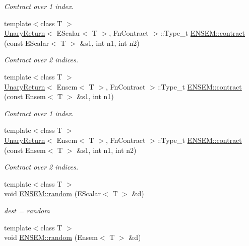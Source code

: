 \begin{DoxyCompactItemize}
\begin{DoxyCompactList}\small\item\em Contract over 1 index. \end{DoxyCompactList}\item 
{\footnotesize template$<$class T $>$ }\\\mbox{\hyperlink{structUnaryReturn}{Unary\+Return}}$<$ E\+Scalar$<$ T $>$, Fn\+Contract $>$\+::Type\+\_\+t \mbox{\hyperlink{namespaceENSEM_a370746f882b263d5a3925d4fae5c899b}{E\+N\+S\+E\+M\+::contract}} (const E\+Scalar$<$ T $>$ \&s1, int n1, int n2)
\begin{DoxyCompactList}\small\item\em Contract over 2 indices. \end{DoxyCompactList}\item 
{\footnotesize template$<$class T $>$ }\\\mbox{\hyperlink{structUnaryReturn}{Unary\+Return}}$<$ Ensem$<$ T $>$, Fn\+Contract $>$\+::Type\+\_\+t \mbox{\hyperlink{namespaceENSEM_ab2179c14714ad6831601c4da09e4de38}{E\+N\+S\+E\+M\+::contract}} (const Ensem$<$ T $>$ \&s1, int n1)
\begin{DoxyCompactList}\small\item\em Contract over 1 index. \end{DoxyCompactList}\item 
{\footnotesize template$<$class T $>$ }\\\mbox{\hyperlink{structUnaryReturn}{Unary\+Return}}$<$ Ensem$<$ T $>$, Fn\+Contract $>$\+::Type\+\_\+t \mbox{\hyperlink{namespaceENSEM_afcb2a43c3eaba0b5250358471ad25179}{E\+N\+S\+E\+M\+::contract}} (const Ensem$<$ T $>$ \&s1, int n1, int n2)
\begin{DoxyCompactList}\small\item\em Contract over 2 indices. \end{DoxyCompactList}\item 
{\footnotesize template$<$class T $>$ }\\void \mbox{\hyperlink{namespaceENSEM_a207bad99cb32c3dd005cf6c6538f2ada}{E\+N\+S\+E\+M\+::random}} (E\+Scalar$<$ T $>$ \&d)
\begin{DoxyCompactList}\small\item\em dest = random \end{DoxyCompactList}\item 
{\footnotesize template$<$class T $>$ }\\void \mbox{\hyperlink{namespaceENSEM_a7e217f3d73216cb71b6221611387c805}{E\+N\+S\+E\+M\+::random}} (Ensem$<$ T $>$ \&d)

\end{DoxyCompactItemize}
